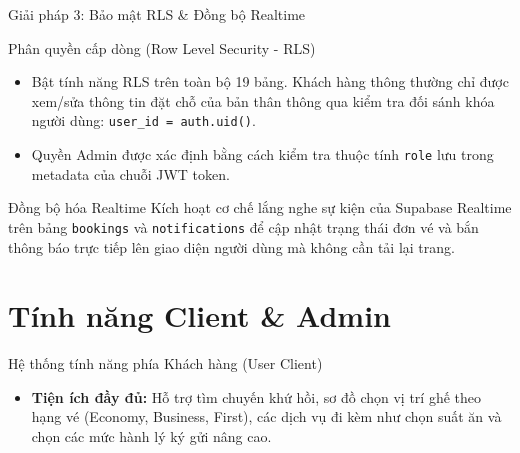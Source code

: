 \documentclass{beamer}
\begin{document}
\begin{frame}{Giải pháp 3: Bảo mật RLS \& Đồng bộ Realtime}
  \begin{block}{Phân quyền cấp dòng (Row Level Security - RLS)}
    \begin{itemize}
      \item Bật tính năng RLS trên toàn bộ 19 bảng. Khách hàng thông thường chỉ được xem/sửa thông tin đặt chỗ của bản thân thông qua kiểm tra đối sánh khóa người dùng: \texttt{user\_id = auth.uid()}.
      \item Quyền Admin được xác định bằng cách kiểm tra thuộc tính \texttt{role} lưu trong metadata của chuỗi JWT token.
    \end{itemize}
  \end{block}
  \begin{exampleblock}{Đồng bộ hóa Realtime}
    Kích hoạt cơ chế lắng nghe sự kiện của Supabase Realtime trên bảng \texttt{bookings} và \texttt{notifications} để cập nhật trạng thái đơn vé và bắn thông báo trực tiếp lên giao diện người dùng mà không cần tải lại trang.
  \end{exampleblock}
\end{frame}

\section{Tính năng Client & Admin}

\begin{frame}{Hệ thống tính năng phía Khách hàng (User Client)}
  \begin{center}
  \end{center}
  \begin{itemize}
    \item \textbf{Tiện ích đầy đủ:} Hỗ trợ tìm chuyến khứ hồi, sơ đồ chọn vị trí ghế theo hạng vé (Economy, Business, First), các dịch vụ đi kèm như chọn suất ăn và chọn các mức hành lý ký gửi nâng cao.
  \end{itemize}
\end{frame}
\end{document}
